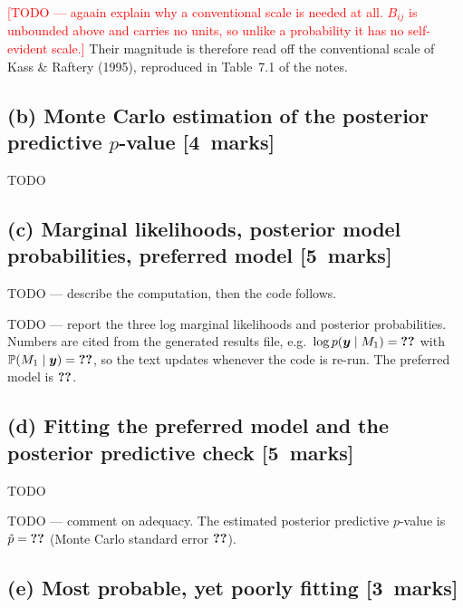 \documentclass[11pt,a4paper]{article}
\makeatletter
\newcommand{\y}{\bm{y}}
\newcommand{\Prob}{\mathbb{P}}
\newcommand{\pycode}[2]{}
\newcommand{\result}[1]{%
  \ifcsname result@#1\endcsname\csname result@#1\endcsname\else\textbf{??}\fi}
\newcommand{\partmarks}[1]{\hfill\normalfont\mbox{[#1 marks]}}
\makeatother
\begin{document}
\textcolor{red}{[TODO --- agaain explain why a conventional scale is needed at all. $B_{ij}$ is
unbounded above and carries no units, so unlike a probability it has no self-evident scale.]}
Their magnitude is therefore read off the conventional scale of Kass \& Raftery (1995),
reproduced in Table~7.1 of the notes.

\subsection*{(b) Monte Carlo estimation of the posterior predictive $p$-value \partmarks{4}}

TODO

\subsection*{(c) Marginal likelihoods, posterior model probabilities, preferred model \partmarks{5}}

TODO --- describe the computation, then the code follows.

\pycode{q1_model_choice}{q1c}

TODO --- report the three log marginal likelihoods and posterior probabilities. Numbers are
cited from the generated results file, e.g.\ $\log p(\y\mid M_1)=\result{q1.logml.M1}$ with
$\Prob(M_1\mid\y)=\result{q1.post.M1}$, so the text updates whenever the code is re-run. The
preferred model is $\result{q1.preferred}$.

\subsection*{(d) Fitting the preferred model and the posterior predictive check \partmarks{5}}

TODO

\pycode{q1_model_choice}{q1d}

TODO --- comment on adequacy. The estimated posterior predictive $p$-value is
$\hat p = \result{q1.ppp}$ (Monte Carlo standard error $\result{q1.ppp.se}$).


\subsection*{(e) Most probable, yet poorly fitting \partmarks{3}}
\end{document}
